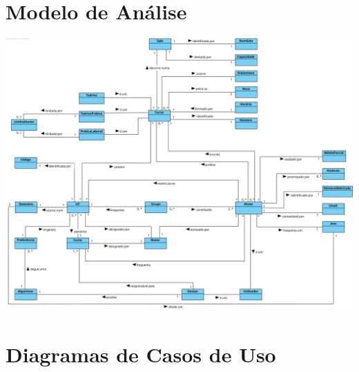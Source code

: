 \documentclass[a4paper,12pt]{scrreprt}
\begin{document}

\chapter{Modelo de Análise}
\vspace{2cm}

\begin{minipage}{\textwidth}
    \centering
    \includegraphics[width=1\textwidth]{images/modelo-analise.png}
    \label{fig:modelo_analise}
\end{minipage}



\chapter{Diagramas de Casos de Uso}
\vspace{1cm}
\end{document}
